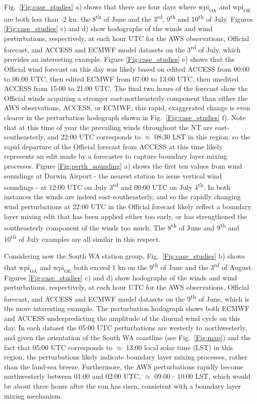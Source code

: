 \documentclass[alpha-refs]{wiley-article}
\begin{document}
Fig.~\ref{Fig:case_studies} a) shows that there are four days where $\text{wpi}_\text{OA}$ and $\text{wpi}_\text{OE}$ are both less than -2 kn: the 8\textsuperscript{th} of June and the 3\textsuperscript{rd}, 9\textsuperscript{th} and 10\textsuperscript{th} of July. Figures \ref{Fig:case_studies} c) and d) show hodographs of the winds and wind perturbations, respectively, at each hour UTC for the AWS observations, Official forecast, and ACCESS and ECMWF model datasets on the 3\textsuperscript{rd} of July, which provides an interesting example. Figure \ref{Fig:case_studies} e) shows that the Official wind forecast on this day was likely based on edited ACCESS from 00:00 to 06:00 UTC, then edited ECMWF from 07:00 to 13:00 UTC, then unedited ACCESS from 15:00 to 21:00 UTC. The final two hours of the forecast show the Official winds acquiring a stronger east-northeasterly component than either the AWS observations, ACCESS, or ECMWF; this rapid, exaggerated change is even clearer in the perturbation hodograph shown in Fig.~\ref{Fig:case_studies} f). Note that at this time of year the prevailing winds throughout the NT are east-southeasterly, and 22:00 UTC corresponds to $\approx$ 08:30 LST in this region, so the rapid departure of the Official forecast from ACCESS at this time likely represents an edit made by a forecaster to capture boundary layer mixing processes. Figure \ref{Fig:perth_sounding} a) shows the first ten values from wind soundings at Darwin Airport - the nearest station to issue vertical wind soundings - at 12:00 UTC on July 3\textsuperscript{rd} and 00:00 UTC on July 4\textsuperscript{th}. In both instances the winds are indeed east-southeasterly, and so the rapidly changing wind perturbations at 22:00 UTC in the Official forecast likely reflect a boundary layer mixing edit that has been applied either too early, or has strengthened the southeasterly component of the winds too much. The 8\textsuperscript{th} of June and 9\textsuperscript{th} and 10\textsuperscript{th} of July examples are all similar in this respect.              

Considering now the South WA station group, Fig.~\ref{Fig:case_studies} b) shows that $\text{wpi}_\text{OA}$ and $\text{wpi}_\text{OE}$ both exceed 1 kn on the 9\textsuperscript{th} of June and the 3\textsuperscript{rd} of August. Figures \ref{Fig:case_studies} c) and d) show hodographs of the winds and wind perturbations, respectively, at each hour UTC for the AWS observations, Official forecast, and ACCESS and ECMWF model datasets on the 9\textsuperscript{th} of June, which is the more interesting example. The perturbation hodograph shows both ECMWF and ACCESS underpredicting the amplitude of the diurnal wind cycle on this day. In each dataset the 05:00 UTC perturbations are westerly to northwesterly, and given the orientation of the South WA coastline (see Fig.~\ref{Fig:map}) and the fact that 05:00 UTC corresponds to $\approx$ 13:00 local solar time (LST) in this region, the perturbations likely indicate boundary layer mixing processes, rather than the land-sea breeze. Furthermore, the AWS perturbations rapidly become northwesterly between 01:00 and 02:00 UTC, $\approx$ 09:00 - 10:00 LST, which would be about three hours after the sun has risen, consistent with a boundary layer mixing mechanism. 
\end{document}

